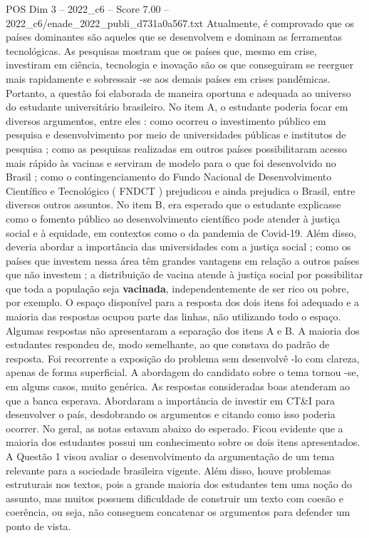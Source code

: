 \begin{textsample}{POS Dim 3 – 2022\_c6 – Score 7.00 – 2022\_c6/enade\_2022\_publi\_d731a0a567.txt}
Atualmente, é comprovado que os países dominantes são aqueles que se desenvolvem e dominam as ferramentas tecnológicas.
As pesquisas mostram que os países que, mesmo em crise, investiram em ciência, tecnologia e inovação são os que conseguiram se reerguer mais rapidamente e sobressair -se aos demais países em crises pandêmicas.
Portanto, a questão foi elaborada de maneira oportuna e adequada ao universo do estudante universitário brasileiro.
No item A, o estudante poderia focar em diversos argumentos, entre eles : como ocorreu o investimento público em pesquisa e desenvolvimento por meio de universidades públicas e institutos de pesquisa ; como as pesquisas realizadas em outros países possibilitaram acesso mais rápido às vacinas e serviram de modelo para o que foi desenvolvido no Brasil ; como o contingenciamento do Fundo Nacional de Desenvolvimento Científico e Tecnológico ( FNDCT ) prejudicou e ainda prejudica o Brasil, entre diversos outros assuntos.
No item B, era esperado que o estudante explicasse como o fomento público ao desenvolvimento científico pode atender à justiça social e à equidade, em contextos como o da pandemia de Covid-19.
Além disso, deveria abordar a importância das universidades com a justiça social ; como os países que investem nessa área têm grandes vantagens em relação a outros países que não investem ; a distribuição de vacina atende à justiça social por possibilitar que toda a população seja \textbf{vacinada}, independentemente de ser rico ou pobre, por exemplo.
O espaço disponível para a resposta dos dois itens foi adequado e a maioria das respostas ocupou parte das linhas, não utilizando todo o espaço.
Algumas respostas não apresentaram a separação dos itens A e B.
A maioria dos estudantes respondeu de, modo semelhante, ao que constava do padrão de resposta.
Foi recorrente a exposição do problema sem desenvolvê -lo com clareza, apenas de forma superficial.
A abordagem do candidato sobre o tema tornou -se, em alguns casos, muito genérica.
As respostas consideradas boas atenderam ao que a banca esperava.
Abordaram a importância de investir em CT\&I para desenvolver o país, desdobrando os argumentos e citando como isso poderia ocorrer.
No geral, as notas estavam abaixo do esperado.
Ficou evidente que a maioria dos estudantes possui um conhecimento sobre os dois itens apresentados.
A Questão 1 visou avaliar o desenvolvimento da argumentação de um tema relevante para a sociedade brasileira vigente.
Além disso, houve problemas estruturais nos textos, pois a grande maioria dos estudantes tem uma noção do assunto, mas muitos possuem dificuldade de construir um texto com coesão e coerência, ou seja, não conseguem concatenar os argumentos para defender um ponto de vista.

\end{textsample}
